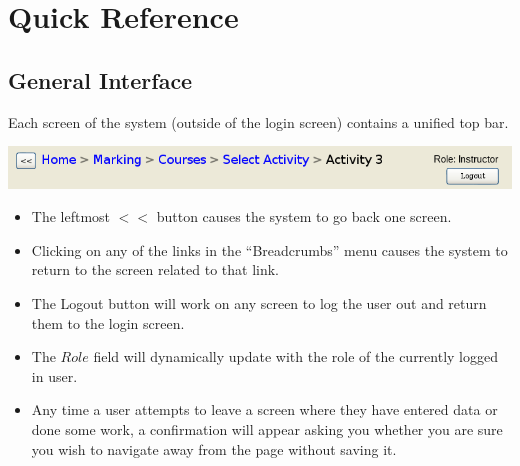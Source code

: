 \documentclass{article}
\begin{document}
\section{Quick Reference}  %
\subsection{General Interface}
Each screen of the system (outside of the login screen) contains a unified top bar. \\
\centerline{\includegraphics[scale=0.55]{../images/UIMockups/pngs/topBar}}
\begin{itemize}
	\item The leftmost $<<$ button causes the system to go back one screen. 
	\item Clicking on any of the links in the ``Breadcrumbs'' menu causes the system 
		to return to the screen related to that link. 
	\item The Logout button will work on any screen to log the user out and return
		them to the login screen.
	\item The $Role$ field will dynamically update with the role of the currently logged
		in user.
	\item Any time a user attempts to leave a screen where they have entered data or
		done some work, a confirmation will appear asking you whether you are sure
		you wish to navigate away from the page without saving it.
\end{itemize}
\end{document}
